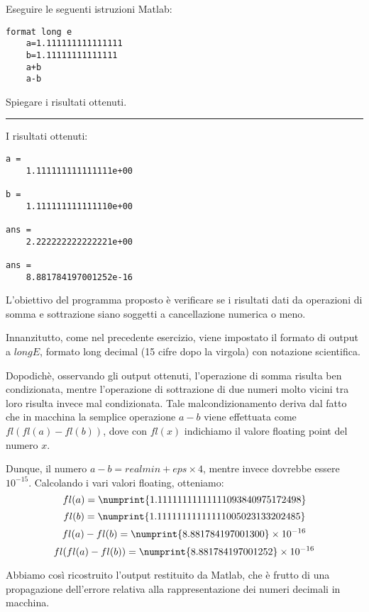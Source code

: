 Eseguire le seguenti istruzioni Matlab:
\begin{lstlisting}[caption = {}]
	format long e
	a=1.111111111111111
	b=1.11111111111111
	a+b
	a-b
\end{lstlisting}
Spiegare i risultati ottenuti.

\hspace*{\fill}
\par\noindent\rule{\textwidth}{0.4pt}
\hspace*{\fill}

I risultati ottenuti:
\begin{lstlisting}[caption = {}]
a =
	1.111111111111111e+00

b =
	1.111111111111110e+00

ans =
	2.222222222222221e+00

ans =
	8.881784197001252e-16

\end{lstlisting}

L'obiettivo del programma proposto è verificare se i risultati dati da operazioni di somma e sottrazione siano soggetti a cancellazione numerica o meno.

Innanzitutto, come nel precedente esercizio, viene impostato il formato di output a $longE$, formato long decimal (15 cifre dopo la virgola) con notazione scientifica.

Dopodichè, osservando gli output ottenuti, l'operazione di somma risulta ben condizionata, mentre l'operazione di sottrazione di due numeri 
molto vicini tra loro risulta invece mal condizionata.
Tale malcondizionamento deriva dal fatto che in macchina la semplice operazione $a-b$ viene effettuata come $fl(fl(a)-fl(b))$, dove con $fl(x)$ 
indichiamo il valore floating point del numero $x$.

Dunque, il numero $a-b = realmin + eps\times4$, mentre invece dovrebbe essere $10^{-15}$. Calcolando i vari valori floating, otteniamo:
$$fl(a) = \numprint{1.11111111111111093840975172498}$$
$$fl(b) = \numprint{1.11111111111111005023133202485}$$
$$fl(a) - fl(b) = \numprint{8.881784197001300}\times10^{-16}$$
$$fl(fl(a) - fl(b)) = \numprint{8.881784197001252}\times10^{-16}$$

Abbiamo così ricostruito l'output restituito da Matlab, che è frutto di una propagazione dell'errore relativa alla rappresentazione dei numeri decimali in macchina.
